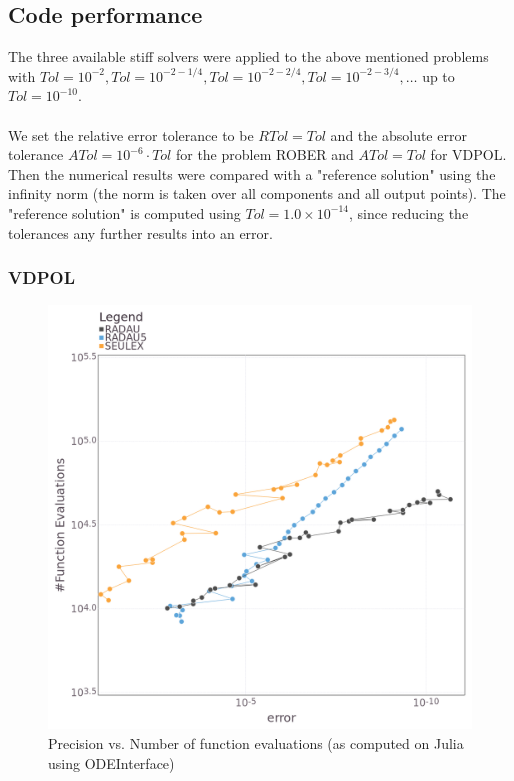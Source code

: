\documentclass[notitlepage,12pt]{article}
\begin{document}

\subsection{Code performance}
\label{sec:codePerfStiff}

The three available stiff solvers were applied to the above mentioned problems with $Tol = 10^{-2} , Tol = 10^{-2-1/4} , Tol = 10^{-2-2/4}, Tol = 10^{-2-3/4},\ldots$ up to $Tol = 10^{-10}$.\\ \\
We set the relative error tolerance to be $RTol=Tol$ and the absolute error tolerance $ATol =10^{-6}\cdot Tol$ for the problem ROBER and $ATol = Tol$ for VDPOL. Then the numerical results were compared with a "reference solution" using the infinity norm (the norm is taken over all components and all output points). The "reference solution" is computed using $Tol=1.0\times 10^{-14}$, since reducing the tolerances any further results into an error.

\subsubsection{VDPOL}
\begin{figure}[H]
\centering
\includegraphics[scale=0.4]{../ImagesAndPDFs/Plots/vdpolPrecisionTest.png}
\caption{Precision vs. Number of function evaluations (as computed on Julia using ODEInterface)}
\label{fig:vdpolJulia}
\end{figure}
\end{document}
